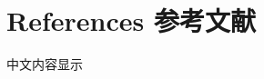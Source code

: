 
\section{References 参考文献}
\begin{frame}[allowframebreaks]
	\ftitle{\textcolor{white}{Bibliography}}
	中文内容显示
	\lipsum[1]
\end{frame}